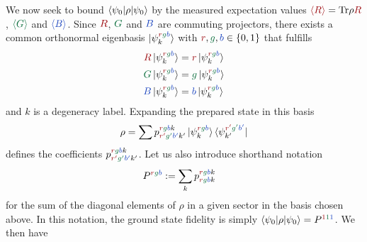 \documentclass[nofootinbib,pra,twocolumn,showpacs,superscriptaddress,notitlepage,amsmath]{revtex4-2} %
\begin{document}
We now seek to bound $\braket{\psi_0| \rho| \psi_0}$ by the measured expectation values $\red{\braket{R}} = \text{Tr}\rho \red{R}$, $\green{\braket{G}}$ and $\blue{\braket{B}}$. Since $\red{R}$, $\green{G}$ and $\blue{B}$ are commuting projectors, there exists a common orthonormal eigenbasis $\ket{\psi^{\red{r}\green{g}
\blue{b}}_k}$ with $\red{r},\green{g},\blue{b} \in \{0,1\}$ that fulfills 
\begin{align}
\label{eq_methods_RGB}
\begin{split}
    \red{R} \ket{\psi^{\red{r}\green{g}\blue{b}}_k} &= \red{r} \ket{\psi^{\red{r}\green{g}\blue{b}}_k} \\
    \green{G} \ket{\psi^{\red{r}\green{g}\blue{b}}_k} &= \green{g} \ket{\psi^{\red{r}\green{g}\blue{b}}_k} \\
    \blue{B} \ket{\psi^{\red{r}\green{g}\blue{b}}_k} &= \blue{b} \ket{\psi^{\red{r}\green{g}\blue{b}}_k}
\end{split}
\end{align}
and $k$ is a degeneracy label. Expanding the prepared state in this basis
\begin{align}
    \rho = \sum p^{\red{r}\green{g}\blue{b}k}_{\red{r'}\green{g'}\blue{b'}k'} \ket{\psi^{\red{r}\green{g}
\blue{b}}_k} \bra{\psi^{\red{r'}\green{g'}
\blue{b'}}_{k'}}
\end{align}
defines the coefficients $p^{\red{r}\green{g}\blue{b}k}_{\red{r'}\green{g'}\blue{b'}k'}$. Let us also introduce shorthand notation
\begin{align}
    P^{\red{r}\green{g}\blue{b}} &:= \sum_k p^{\red{r}\green{g}\blue{b}k}_{\red{r}\green{g}\blue{b}k}
\end{align}
for the sum of the diagonal elements of $\rho$ in a given sector in the basis chosen above. In this notation, the ground state fidelity is simply $\braket{\psi_0 | \rho |\psi_0} =  P^{\red{1}\green{1}\blue{1}}$. We then have
\end{document}
